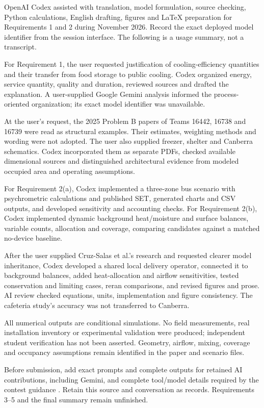 \documentclass[12pt]{article}
\begin{document}
OpenAI Codex assisted with translation, model formulation, source checking, Python calculations, English drafting, figures and LaTeX preparation for Requirements 1 and 2 during November 2026. Record the exact deployed model identifier from the session interface. The following is a usage summary, not a transcript.

For Requirement 1, the user requested justification of cooling-efficiency quantities and their transfer from food storage to public cooling. Codex organized energy, service quantity, quality and duration, reviewed sources and drafted the explanation. A user-supplied Google Gemini analysis informed the process-oriented organization; its exact model identifier was unavailable.

At the user's request, the 2025 Problem B papers of Teams 16442, 16738 and 16739 were read as structural examples. Their estimates, weighting methods and wording were not adopted. The user also supplied freezer, shelter and Canberra schematics. Codex incorporated them as separate PDFs, checked available dimensional sources and distinguished architectural evidence from modeled occupied area and operating assumptions.

For Requirement 2(a), Codex implemented a three-zone bus scenario with psychrometric calculations and published SET, generated charts and CSV outputs, and developed sensitivity and accounting checks. For Requirement 2(b), Codex implemented dynamic background heat/moisture and surface balances, variable counts, allocation and coverage, comparing candidates against a matched no-device baseline.

After the user supplied Cruz-Salas et al.'s research and requested clearer model inheritance, Codex developed a shared local delivery operator, connected it to background balances, added heat-allocation and airflow sensitivities, tested conservation and limiting cases, reran comparisons, and revised figures and prose. AI review checked equations, units, implementation and figure consistency. The cafeteria study's accuracy was not transferred to Canberra.

All numerical outputs are conditional simulations. No field measurements, real installation inventory or experimental validation were produced; independent student verification has not been asserted. Geometry, airflow, mixing, coverage and occupancy assumptions remain identified in the paper and scenario files.

Before submission, add exact prompts and complete outputs for retained AI contributions, including Gemini, and complete tool/model details required by the contest guidance \cite{aipolicy}. Retain this source and conversation as records. Requirements 3--5 and the final summary remain unfinished.
\end{document}
